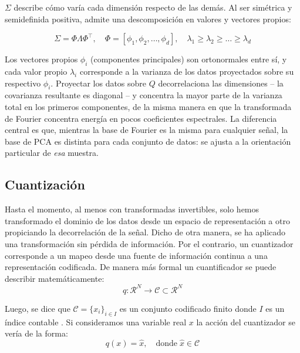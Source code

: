         $\Sigma$ describe cómo varía cada dimensión respecto de las demás. Al ser simétrica y semidefinida positiva, admite una descomposición en valores y vectores propios:

	\begin{equation}
	    \Sigma = \Phi \Lambda \Phi^\top, \quad \Phi = [\phi_1, \phi_2, \dots, \phi_d], \quad \lambda_1 \geq \lambda_2 \geq \dots \geq \lambda_d
	\end{equation}

        Los vectores propios $\phi_i$ (componentes principales) son ortonormales entre sí, y cada valor propio $\lambda_i$ corresponde a la varianza de los datos proyectados sobre su respectivo $\phi_i$. Proyectar los datos sobre $Q$ decorrelaciona las dimensiones -- la covarianza resultante es diagonal -- y concentra la mayor parte de la varianza total en los primeros componentes, de la misma manera en que la transformada de Fourier concentra energía en pocos coeficientes espectrales. La diferencia central es que, mientras la base de Fourier es la misma para cualquier señal, la base de PCA es distinta para cada conjunto de datos: se ajusta a la orientación particular de \emph{esa} muestra.

    \subsection{Cuantización}
        Hasta el momento, al menos con transformadas invertibles, solo hemos transformado el dominio de los datos desde un espacio de representación a otro propiciando la decorrelación de la señal. Dicho de otra manera, se ha aplicado una transformación sin pérdida de información. Por el contrario, un cuantizador corresponde a un mapeo desde una fuente de información continua a una representación codificada. De manera más formal un cuantificador se puede describir matemáticamente:
        \begin{equation}
            q: \mathcal{R}^N \longrightarrow \mathcal{C} \subset \mathcal{R}^N
        \end{equation}
        
        Luego, se dice que $\mathcal{C} = \{x_i\}_{i \in I}$ es un conjunto codificado finito donde $I$ es un índice contable \cite{goyal2001theoretical}. Si consideramos una variable real $x$ la acción del cuantizador se vería de la forma:
        \begin{equation}
            q(x) = \hat{x}, \quad \text{donde}\; \hat{x} \in \mathcal{C}
        \end{equation}
        
